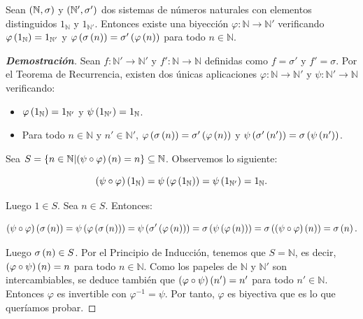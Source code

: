 \begin{proposition}
  \rm Sean $\left(\mathbb{N},\sigma\right)$ y $\left(\mathbb{N}',\sigma'\right)$ dos sistemas de números naturales con elementos distinguidos $1_{\mathbb{N}}$ y $1_{\mathbb{N}'}$. Entonces existe una biyección $\varphi:\mathbb{N}\rightarrow\mathbb{N}'$ verificando $\varphi\left(1_{\mathbb{N}}\right)=1_{\mathbb{N}'}$ y $\varphi\left(\sigma\left(n\right)\right)=\sigma'\left(\varphi\left(n\right)\right)$ para todo $n\in\mathbb{N}$.
  \begin{proof}[\rm\textbf{Demostración}]
    \rm Sean $f:\mathbb{N}'\rightarrow\mathbb{N}'$ y $f':\mathbb{N}\rightarrow\mathbb{N}$ definidas como $f=\sigma'$ y $f'=\sigma$. Por el Teorema de Recurrencia, existen dos únicas aplicaciones $\varphi:\mathbb{N}\rightarrow\mathbb{N}'$ y $\psi:\mathbb{N}'\rightarrow\mathbb{N}$ verificando:

    \begin{itemize}
      \item $\varphi\left(1_{\mathbb{N}}\right)=1_{\mathbb{N}'}$ y $\psi\left(1_{\mathbb{N}'}\right)=1_{\mathbb{N}}$.
      \item Para todo $n\in\mathbb{N}$ y $n'\in\mathbb{N}'$, $\varphi\left(\sigma\left(n\right)\right)=\sigma'\left(\varphi\left(n\right)\right)$ y $\psi\left(\sigma'\left(n'\right)\right)=\sigma\left(\psi\left(n'\right)\right)$.
    \end{itemize}

    Sea $S=\left\{n\in\mathbb{N}\middle|\left(\psi\circ\varphi\right)\left(n\right)=n\right\}\subseteq\mathbb{N}$. Observemos lo siguiente:

    \begin{equation}
      \left(\psi\circ\varphi\right)\left(1_{\mathbb{N}}\right)=\psi\left(\varphi\left(1_{\mathbb{N}}\right)\right)=\psi\left(1_{\mathbb{N}'}\right)=1_{\mathbb{N}}.
    \end{equation}

    Luego $1\in S$. Sea $n\in S$. Entonces:

    \begin{equation}
      \left(\psi\circ\varphi\right)\left(\sigma\left(n\right)\right)=\psi\left(\varphi\left(\sigma\left(n\right)\right)\right)=\psi\left(\sigma'\left(\varphi\left(n\right)\right)\right)=\sigma\left(\psi\left(\varphi\left(n\right)\right)\right)=\sigma\left(\left(\psi\circ\varphi\right)\left(n\right)\right)=\sigma\left(n\right).
    \end{equation}

    Luego $\sigma\left(n\right)\in S$. Por el Principio de Inducción, tenemos que $S=\mathbb{N}$, es decir, $\left(\varphi\circ\psi\right)\left(n\right)=n$ para todo $n\in\mathbb{N}$. Como los papeles de $\mathbb{N}$ y $\mathbb{N}'$ son intercambiables, se deduce también que $\left(\varphi\circ\psi\right)\left(n'\right)=n'$ para todo $n'\in\mathbb{N}$. Entonces $\varphi$ es invertible con $\varphi^{-1}=\psi$. Por tanto, $\varphi$ es biyectiva que es lo que queríamos probar.

  \end{proof}
\end{proposition}

